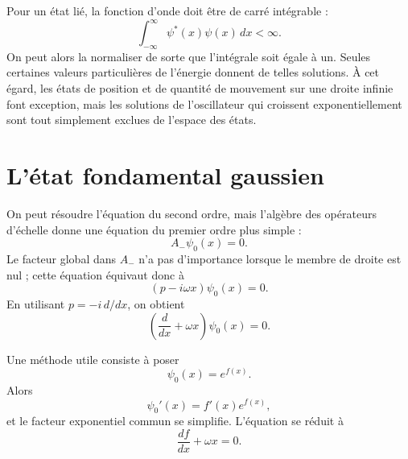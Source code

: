 Pour un état lié, la fonction d’onde doit être de carré intégrable :
\begin{equation}
\int_{-\infty}^{\infty}\psi^{*}(x)\psi(x)\,dx<\infty.
\end{equation}
On peut alors la normaliser de sorte que l’intégrale soit égale à un. Seules certaines valeurs particulières de l’énergie donnent de telles solutions. À cet égard, les états de position et de quantité de mouvement sur une droite infinie font exception, mais les solutions de l’oscillateur qui croissent exponentiellement sont tout simplement exclues de l’espace des états.

\section{L’état fondamental gaussien}

On peut résoudre l’équation du second ordre, mais l’algèbre des opérateurs d’échelle donne une équation du premier ordre plus simple :
\begin{equation}
A_{-}\psi_{0}(x)=0.
\end{equation}
Le facteur global dans \(A_{-}\) n’a pas d’importance lorsque le membre de droite est nul ; cette équation équivaut donc à
\begin{equation}
(p-i\omega x)\psi_{0}(x)=0.
\end{equation}
En utilisant \(p=-i\,d/dx\), on obtient
\begin{equation}
\left(\frac{d}{dx}+\omega x\right)\psi_{0}(x)=0.
\end{equation}

\begin{classroomqa}
\end{classroomqa}

Une méthode utile consiste à poser
\begin{equation}
\psi_{0}(x)=e^{f(x)}.
\end{equation}
Alors
\[
\psi_{0}'(x)=f'(x)e^{f(x)},
\]
et le facteur exponentiel commun se simplifie. L’équation se réduit à
\begin{equation}
\frac{df}{dx}+\omega x=0.
\end{equation}

